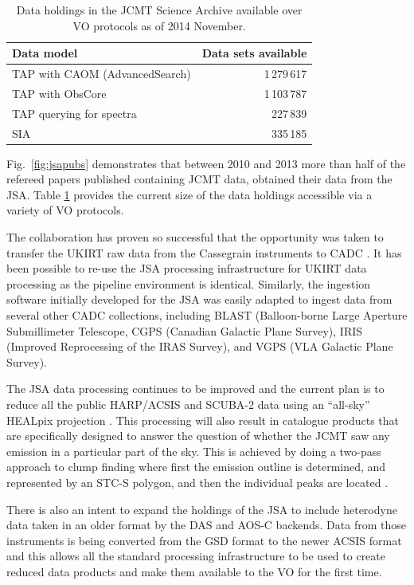 \documentclass[final,authoryear,5p,times,twocolumn]{elsarticle}
\newcommand*\figref[1]{Fig.~\ref{#1}}
\begin{document}
\begin{table}
\caption{Data holdings in the JCMT Science Archive available over VO
  protocols as of 2014 November.}
\label{tab:cadcvo}
\begin{center}
\begin{tabular}{|l|r|}
\hline
Data model & Data sets available\\ \hline
TAP with CAOM (AdvancedSearch) & 1\,279\,617 \\
TAP with ObsCore & 1\,103\,787\\
TAP querying for spectra & 227\,839\\
SIA  & 335\,185\\ \hline
\end{tabular}
\end{center}
\end{table}

\figref{fig:jsapubs} demonstrates that between 2010 and 2013 more
than half of the refereed papers published containing JCMT data,
obtained their data from the JSA. Table \ref{tab:cadcvo} provides the
current size of the data holdings accessible via a variety of VO protocols.

The collaboration has proven so successful that the opportunity was
taken to transfer the UKIRT raw data from the Cassegrain instruments
to CADC \citep{adassxxiii_P01}. It has been possible to re-use
the JSA processing infrastructure for UKIRT data processing as the
pipeline environment is identical.  Similarly, the ingestion
software initially developed for the JSA was easily adapted to ingest
data from several other CADC collections, including BLAST
(Balloon-borne Large Aperture Submillimeter Telescope, CGPS
(Canadian Galactic Plane Survey), IRIS (Improved Reprocessing
of the IRAS Survey), and VGPS (VLA Galactic Plane Survey).

The JSA data processing continues to be improved
\citep{2014JCMTN35..19J} and the current plan is to reduce all the
public HARP/ACSIS and SCUBA-2 data using an ``all-sky'' HEALpix
projection \citep{2014SPIE9152-93,2014JCMTN35..20B}. This processing
will also result in catalogue products that are specifically designed
to answer the question of whether the JCMT saw any emission in a
particular part of the sky. This is achieved by doing a two-pass
approach to clump
finding where first the emission outline is determined, and represented
by an STC-S polygon, and then the individual peaks are located
\citep{2014JCMTN35..21G}.

There is also an intent to expand the holdings of the JSA to include
heterodyne data taken in an older format by the DAS
\citep{1986SPIE..598..134B} and AOS-C backends. Data from those
instruments is being converted from the GSD format \citep{GSD1999} to the newer ACSIS format and this
allows all the standard processing infrastructure to be used to create
reduced data products and make them available to the VO for the first
time.
\end{document}
